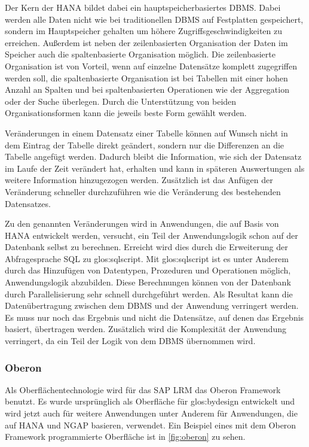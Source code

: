 Der Kern der \gls{HANA} bildet dabei ein hauptspeicherbasiertes \gls{DBMS}. Dabei werden alle Daten nicht wie bei traditionellen \gls{DBMS} auf Festplatten gespeichert, sondern im Hauptspeicher gehalten um höhere Zugriffsgeschwindigkeiten zu erreichen. Außerdem ist neben der zeilenbasierten Organisation der Daten im Speicher auch die spaltenbasierte Organisation möglich. Die zeilenbasierte Organisation ist von Vorteil, wenn auf einzelne Datensätze komplett zugegriffen werden soll, die spaltenbasierte Organisation ist bei Tabellen mit einer hohen Anzahl an Spalten und bei spaltenbasierten Operationen wie der Aggregation oder der Suche überlegen. Durch die Unterstützung von beiden Organisationsformen kann die jeweils beste Form gewählt werden.

Veränderungen in einem Datensatz einer Tabelle können auf Wunsch nicht in dem Eintrag der Tabelle direkt geändert, sondern nur die Differenzen an die Tabelle angefügt werden. Dadurch bleibt die Information, wie sich der Datensatz im Laufe der Zeit verändert hat, erhalten und kann in späteren Auswertungen als weitere Information hinzugezogen werden. Zusätzlich ist das Anfügen der Veränderung schneller durchzuführen wie die Veränderung des bestehenden Datensatzes.

Zu den genannten Veränderungen wird in Anwendungen, die auf Basis von \gls{HANA} entwickelt werden, versucht, ein Teil der Anwendungslogik schon auf der Datenbank selbst zu berechnen. Erreicht wird dies durch die Erweiterung der Abfragesprache \gls{SQL} zu \gls{glos:sqlscript}. Mit \gls{glos:sqlscript} ist es unter Anderem durch das Hinzufügen von Datentypen, Prozeduren und Operationen möglich, Anwendungslogik abzubilden. Diese Berechnungen können von der Datenbank durch Parallelisierung sehr schnell durchgeführt werden. Als Resultat kann die Datenübertragung zwischen dem \gls{DBMS} und der Anwendung verringert werden. Es muss nur noch das Ergebnis und nicht die Datensätze, auf denen das Ergebnis basiert, übertragen werden. Zusätzlich wird die Komplexität der Anwendung verringert, da ein Teil der Logik von dem \gls{DBMS} übernommen wird.

\subsubsection{Oberon}
Als Oberflächentechnologie wird für das SAP LRM das Oberon Framework benutzt. Es wurde ursprünglich als Oberfläche für \gls{glos:bydesign} entwickelt und wird jetzt auch für weitere Anwendungen unter Anderem für Anwendungen, die auf HANA und NGAP basieren, verwendet. Ein Beispiel eines mit dem Oberon Framework programmierte Oberfläche ist in \vref{fig:oberon} zu sehen.

